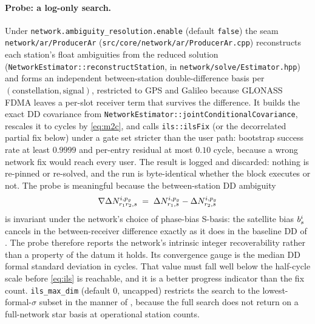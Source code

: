 \documentclass[main.tex]{subfiles}
\begin{document}
\paragraph{Probe: a log-only search.}
Under \texttt{network.ambiguity\_resolution.enable} (default
\texttt{false}) the seam \texttt{network/ar/ProducerAr}
(\texttt{src/core/network/ar/ProducerAr.cpp}) reconstructs each station's
float ambiguities from the reduced solution
(\texttt{NetworkEstimator::reconstructStation}, in
\texttt{network/solve/Estimator.hpp}) and forms an independent
between-station double-difference basis per $(\text{constellation},
\text{signal})$, restricted to GPS and Galileo because GLONASS FDMA leaves a
per-slot receiver term that survives the difference.  It builds the exact DD
covariance from \texttt{NetworkEstimator::jointConditionalCovariance},
rescales it to cycles by \eqref{eq:m2c}, and calls \texttt{ils::ilsFix} (or
the decorrelated partial fix below) under a gate set stricter than the user
path: bootstrap success rate at least $0.9999$ and per-entry residual at most
$0.10$ cycle, because a wrong network fix would reach every user.  The result
is logged and discarded: nothing is re-pinned or re-solved, and the run is
byte-identical whether the block executes or not.  The probe is meaningful
because the between-station DD ambiguity
\begin{equation}
\nabla\Delta N^{i,p_{g}}_{r_1r_2,s}
\;=\;
\Delta N^{i,p_{g}}_{r_1,s} - \Delta N^{i,p_{g}}_{r_2,s}
\label{eq:net-dd-invariant}
\end{equation}
is invariant under the network's choice of phase-bias S-basis: the
satellite bias $b^i_s$ cancels in the between-receiver
difference exactly as it does in the baseline DD of
.  The probe therefore reports the network's intrinsic integer
recoverability rather than a property of the datum it holds.  Its
convergence gauge is the median DD formal standard deviation in cycles.
That value must fall well below the half-cycle scale before
\eqref{eq:ils} is reachable, and it is a better progress indicator than the
fix count.  \texttt{ils\_max\_dim} (default $0$, uncapped) restricts the
search to the lowest-formal-$\sigma$ subset in the manner of
, because the full search does not return on a
full-network star basis at operational station counts.
\end{document}
